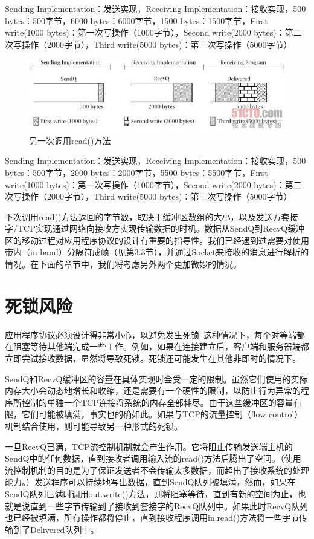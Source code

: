 	Sending Implementation：发送实现，Receiving Implementation：接收实现，500 bytes：500字节，6000 bytes：6000字节，1500 bytes：1500字节，First write(1000 bytes)：第一次写操作（1000字节），Second write(2000 bytes)：第二次写操作（2000字节），Third write(5000 bytes)：第三次写操作（5000字节）

	\begin{figure}[htbp]%
		\centering
		\includegraphics[scale=.6]{img/06.04.jpg}
		\caption{另一次调用read()方法}
		\label{fig:another.call.read.func}
	\end{figure}

	Sending Implementation：发送实现，Receiving Implementation：接收实现，500 bytes：500字节，2000 bytes：2000字节，5500 bytes：5500字节，First write(1000 bytes)：第一次写操作（1000字节），Second write(2000 bytes)：第二次写操作（2000字节），Third write(5000 bytes)：第三次写操作（5000字节）

	下次调用read()方法返回的字节数，取决于缓冲区数组的大小，以及发送方套接字/TCP实现通过网络向接收方实现传输数据的时机。数据从SendQ到RecvQ缓冲区的移动过程对应用程序协议的设计有重要的指导性。我们已经遇到过需要对使用带内（in-band）分隔符成帧（见第3.3节），并通过Socket来接收的消息进行解析的情况。在下面的章节中，我们将考虑另外两个更加微妙的情况。

\section{死锁风险}

	应用程序协议必须设计得非常小心，以避免发生死锁--这种情况下，每个对等端都在阻塞等待其他端完成一些工作。例如，如果在连接建立后，客户端和服务器端都立即尝试接收数据，显然将导致死锁。死锁还可能发生在其他非即时的情况下。

	SendQ和RecvQ缓冲区的容量在具体实现时会受一定的限制。虽然它们使用的实际内存大小会动态地增长和收缩，还是需要有一个硬性的限制，以防止行为异常的程序所控制的单独一个TCP连接将系统的内存全部耗尽。由于这些缓冲区的容量有限，它们可能被填满，事实也的确如此。如果与TCP的流量控制（flow control）机制结合使用，则可能导致另一种形式的死锁。

	一旦RecvQ已满，TCP流控制机制就会产生作用。它将阻止传输发送端主机的SendQ中的任何数据，直到接收者调用输入流的read()方法后腾出了空间。（使用流控制机制的目的是为了保证发送者不会传输太多数据，而超出了接收系统的处理能力。）发送程序可以持续地写出数据，直到SendQ队列被填满，然而，如果在SendQ队列已满时调用out.write()方法，则将阻塞等待，直到有新的空间为止，也就是说直到一些字节传输到了接收到套接字的RecvQ队列中。如果此时RecvQ队列也已经被填满，所有操作都将停止，直到接收程序调用in.read()方法将一些字节传输到了Delivered队列中。

